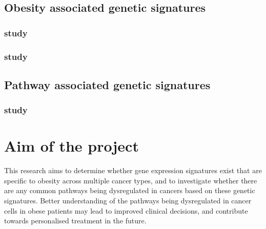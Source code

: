 
\subsection{Obesity associated genetic signatures}
\label{sub:obesity_associated_genetic_signatures}

\subsubsection{\citet{Creighton2012} study}
\label{ssub:creighton_study}



\subsubsection{\citet{Fuentes-Mattei2014} study}
\label{ssub:fuentes_mattei_study}




\subsection{Pathway associated genetic signatures}
\label{sub:pathway_associated_genetic_signatures}


\subsubsection{\citet{Gatza2011} study}
\label{ssub:gatza_study}





\section{Aim of the project}
\label{sec:aim}

This research aims to determine whether gene expression signatures exist  that are specific to obesity across multiple cancer types, and to investigate whether there are any common pathways being dysregulated in cancers based on these genetic signatures.
Better understanding of the pathways being dysregulated in cancer cells in obese patients may lead to improved clinical decisions, and contribute towards personalised treatment in the future.

